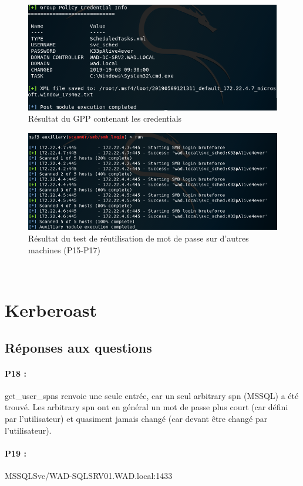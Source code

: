 \documentclass[12pt]{report} %
\begin{document}
\begin{figure}[!h]
	\includegraphics[width=17cm]{3_3_gather_credentials.PNG}
	\caption*{Résultat du GPP contenant les credentials}
\end{figure}

\begin{figure}[!h]
	\includegraphics[width=17cm]{3_3_reused_passwords.PNG}
	\caption*{Résultat du test de réutilisation de mot de passe sur d'autres machines (P15-P17)}
\end{figure}


\newpage
~
\newpage
~
\newpage

\section*{Kerberoast}

\subsection*{Réponses aux questions}
\paragraph{P18 :} get\_user\_spns renvoie une seule entrée, car un seul arbitrary spn (MSSQL) a été trouvé. Les arbitrary spn ont en général un mot de passe plus court (car défini par l'utilisateur) et quasiment jamais changé (car devant être changé par l'utilisateur).
\paragraph{P19 :} MSSQLSvc/WAD-SQLSRV01.WAD.local:1433
\end{document}
